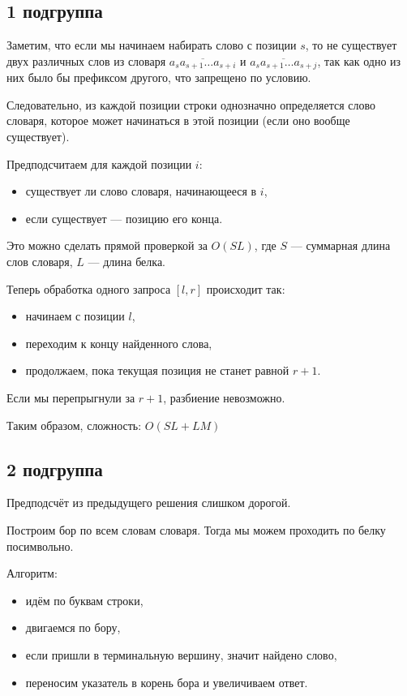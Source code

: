 \subsection*{1 подгруппа}

Заметим, что если мы начинаем набирать слово с позиции $s$, то не существует двух различных слов из словаря
$\overline{a_s a_{s+1} \ldots a_{s+i}}$
и
$\overline{a_s a_{s+1} \ldots a_{s+j}}$,
так как одно из них было бы префиксом другого, что запрещено по условию.

Следовательно, из каждой позиции строки однозначно определяется слово словаря, которое может начинаться в этой позиции (если оно вообще существует).

Предподсчитаем для каждой позиции $i$:
\begin{itemize}
    \item существует ли слово словаря, начинающееся в $i$,
    \item если существует --- позицию его конца.
\end{itemize}

Это можно сделать прямой проверкой за $O(SL)$, где $S$ --- суммарная длина слов словаря, $L$ --- длина белка.

Теперь обработка одного запроса $[l, r]$ происходит так:
\begin{itemize}
    \item начинаем с позиции $l$,
    \item переходим к концу найденного слова,
    \item продолжаем, пока текущая позиция не станет равной $r+1$.
\end{itemize}

Если мы перепрыгнули за $r+1$, разбиение невозможно.

Таким образом, сложность: $O(SL + LM)$

\subsection*{2 подгруппа}

Предподсчёт из предыдущего решения слишком дорогой.

Построим бор по всем словам словаря. Тогда мы можем проходить по белку посимвольно.

Алгоритм:
\begin{itemize}
    \item идём по буквам строки,
    \item двигаемся по бору,
    \item если пришли в терминальную вершину, значит найдено слово,
    \item переносим указатель в корень бора и увеличиваем ответ.
\end{itemize}

